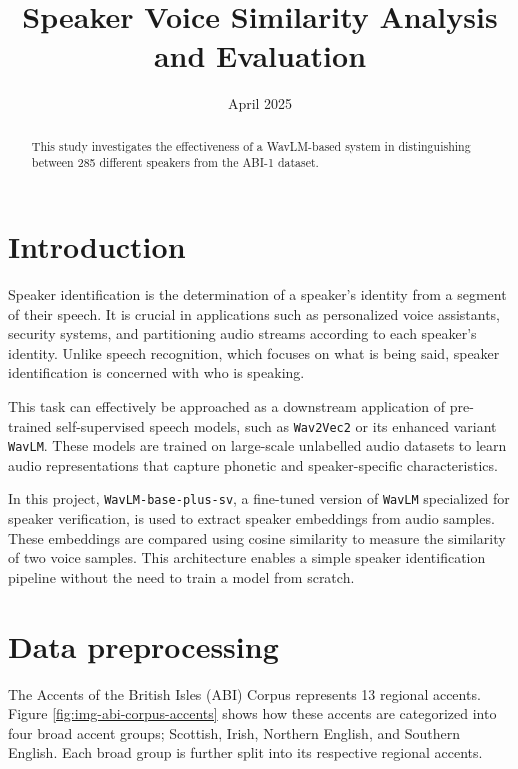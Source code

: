 \documentclass[conference]{IEEEtran}
\begin{document}
	
\title{Speaker Voice Similarity Analysis and Evaluation}

	
\author{
	\date{April 2025}
	
}

\maketitle

\begin{abstract}
This study investigates the effectiveness of a WavLM-based system in distinguishing between 285 different speakers from the ABI-1 dataset. \end{abstract}



\section{Introduction}

Speaker identification is the determination of a speaker's identity from a segment of their speech. It is crucial in applications such as personalized voice assistants, security systems, and partitioning audio streams according to each speaker's identity. Unlike speech recognition, which focuses on what is being said, speaker identification is concerned with who is speaking.

This task can effectively be approached as a downstream application of pre-trained self-supervised speech models, such as \texttt{Wav2Vec2}\cite{baevski2020wav2vec} or its enhanced variant \texttt{WavLM}\cite{chen2022wavlm}. These models are trained on large-scale unlabelled audio datasets to learn audio representations that capture phonetic and speaker-specific characteristics.

In this project, \texttt{WavLM-base-plus-sv}, a fine-tuned version of \texttt{WavLM} specialized for speaker verification, is used to extract speaker embeddings from audio samples. These embeddings are compared using cosine similarity to measure the similarity of two voice samples. This architecture enables a simple speaker identification pipeline without the need to train a model from scratch.


\section{Data preprocessing}
\label{sec:data-processing}

The Accents of the British Isles (ABI) Corpus represents 13 regional accents. Figure \ref{fig:img-abi-corpus-accents} shows how these accents are categorized into four broad accent groups; Scottish, Irish, Northern English, and Southern English. Each broad group is further split into its respective regional accents\cite{najafian2016improving}.
\end{document}
